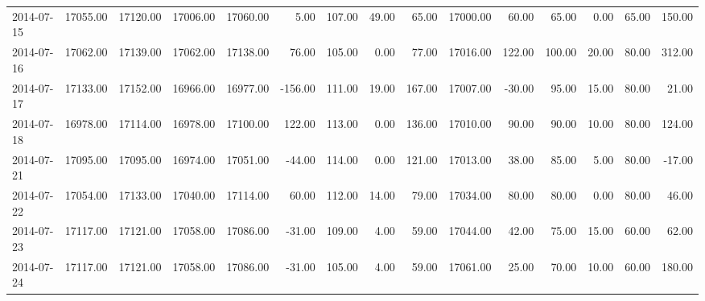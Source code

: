 \documentclass{article}
\begin{document}
\begin{table}[ht]
\begin{tabular}{lrrrrrrrrrrrrrr}
  2014-07-15 & 17055.00 & 17120.00 & 17006.00 & 17060.00 & 5.00 & 107.00 & 49.00 & 65.00 & 17000.00 & 60.00 & 65.00 & 0.00 & 65.00 & 150.00 \\ 
  2014-07-16 & 17062.00 & 17139.00 & 17062.00 & 17138.00 & 76.00 & 105.00 & 0.00 & 77.00 & 17016.00 & 122.00 & 100.00 & 20.00 & 80.00 & 312.00 \\ 
  2014-07-17 & 17133.00 & 17152.00 & 16966.00 & 16977.00 & -156.00 & 111.00 & 19.00 & 167.00 & 17007.00 & -30.00 & 95.00 & 15.00 & 80.00 & 21.00 \\ 
  2014-07-18 & 16978.00 & 17114.00 & 16978.00 & 17100.00 & 122.00 & 113.00 & 0.00 & 136.00 & 17010.00 & 90.00 & 90.00 & 10.00 & 80.00 & 124.00 \\ 
  2014-07-21 & 17095.00 & 17095.00 & 16974.00 & 17051.00 & -44.00 & 114.00 & 0.00 & 121.00 & 17013.00 & 38.00 & 85.00 & 5.00 & 80.00 & -17.00 \\ 
  2014-07-22 & 17054.00 & 17133.00 & 17040.00 & 17114.00 & 60.00 & 112.00 & 14.00 & 79.00 & 17034.00 & 80.00 & 80.00 & 0.00 & 80.00 & 46.00 \\ 
  2014-07-23 & 17117.00 & 17121.00 & 17058.00 & 17086.00 & -31.00 & 109.00 & 4.00 & 59.00 & 17044.00 & 42.00 & 75.00 & 15.00 & 60.00 & 62.00 \\ 
  2014-07-24 & 17117.00 & 17121.00 & 17058.00 & 17086.00 & -31.00 & 105.00 & 4.00 & 59.00 & 17061.00 & 25.00 & 70.00 & 10.00 & 60.00 & 180.00 \\ 
   \hline
\end{tabular}
\end{table}
\end{document}

